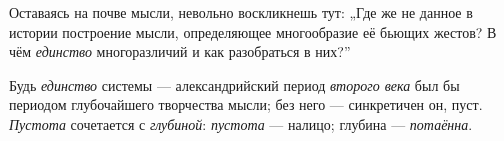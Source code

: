 \documentclass[12pt,a4paper,oneside]{book}
\begin{document}
Оставаясь на почве мысли, невольно воскликнешь тут: „Где же не данное в истории построение мысли, определяющее многообразие её бьющих жестов? В чём \emph{единство} многоразличий и как разобраться в них?”

Будь \emph{единство} системы — александрийский период \emph{второго века} был бы периодом глубочайшего творчества мысли; без него — синкретичен он, пуст. \emph{Пустота} сочетается с \emph{глубиной}: \emph{пустота} — налицо; глубина — \emph{потаённа}.
\end{document}
